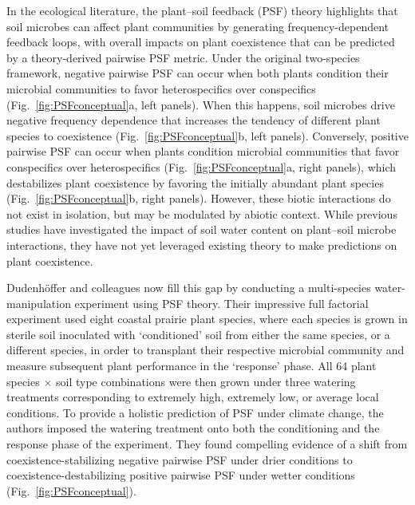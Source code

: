 \documentclass[hidelinks,letterpaper, 11pt]{article}
\begin{document}
In the ecological literature, the plant--soil feedback (PSF) theory \citep{Bever1997} highlights that soil microbes can affect plant communities by generating frequency-dependent feedback loops, with overall impacts on plant coexistence that can be predicted by a theory-derived pairwise PSF metric.
Under the original two-species framework, negative pairwise PSF can occur when both plants condition their microbial communities to favor heterospecifics over conspecifics (Fig.~\ref{fig:PSFconceptual}a, left panels). 
When this happens, soil microbes drive negative frequency dependence that increases the tendency of different plant species to coexistence (Fig.~\ref{fig:PSFconceptual}b, left panels). 
Conversely, positive pairwise PSF can occur when plants condition microbial communities that favor conspecifics over heterospecifics (Fig.~\ref{fig:PSFconceptual}a, right panels), which destabilizes plant coexistence by favoring the initially abundant plant species (Fig.~\ref{fig:PSFconceptual}b, right panels).
However, these biotic interactions do not exist in isolation, but may be modulated by abiotic context. 
While previous studies have investigated the impact of soil water content on plant--soil microbe interactions, they have not yet leveraged existing theory to make predictions on plant coexistence.
\medskip 

Dudenh{\"o}ffer and colleagues now fill this gap by conducting a multi-species water-manipulation experiment using PSF theory. 
Their impressive full factorial experiment used eight coastal prairie plant species, where each species is grown in sterile soil inoculated with `conditioned' soil from either the same species, or a different species, in order to transplant their respective microbial community and measure subsequent plant performance in the `response' phase.
All 64 plant species $\times$ soil type combinations were then grown under three watering treatments corresponding to extremely high, extremely low, or average local conditions.
To provide a holistic prediction of PSF under climate change, the authors imposed the watering treatment onto both the conditioning and the response phase of the experiment.
They found compelling evidence of a shift from coexistence-stabilizing negative pairwise PSF under drier conditions to coexistence-destabilizing positive pairwise PSF under wetter conditions (Fig.~\ref{fig:PSFconceptual}).
\medskip
\end{document}

